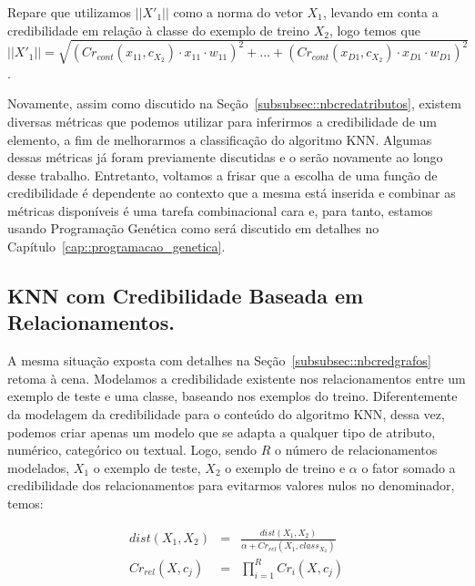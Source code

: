 Repare que utilizamos $||X'_1||$ como a norma do vetor $X_1$, levando em conta a credibilidade em relação à classe do exemplo de treino $X_2$, logo temos que $||X'_1|| = \sqrt{ ( Cr_{cont}(x_{11}, c_{X_2}) \cdot x_{11} \cdot w_{11} )^2 + ... +  ( Cr_{cont}(x_{D1}, c_{X_2}) \cdot x_{D1} \cdot w_{D1} )^2}$.

Novamente, assim como discutido na Seção~\ref{subsubsec::nbcredatributos}, existem diversas métricas que podemos utilizar para inferirmos a credibilidade de um elemento, a fim de melhorarmos a classificação do algoritmo \textsc{KNN}. Algumas dessas métricas já foram previamente discutidas e o serão novamente ao longo desse trabalho. Entretanto, voltamos a frisar que a escolha de uma função de credibilidade é dependente ao contexto que a mesma está inserida e combinar as métricas disponíveis é uma tarefa combinacional cara e, para tanto, estamos usando Programação Genética como será discutido em detalhes no Capítulo~\ref{cap::programacao_genetica}.

\subsection{\textsc{KNN} com Credibilidade Baseada em Relacionamentos.}
\label{subsubsec::knncredgrafos}

A mesma situação exposta com detalhes na Seção~\ref{subsubsec::nbcredgrafos} retoma à cena. Modelamos a credibilidade existente nos relacionamentos entre um exemplo de teste e uma classe, baseando nos exemplos do treino. 
Diferentemente da modelagem da credibilidade para o conteúdo do algoritmo \textsc{KNN}, dessa vez, podemos criar apenas um modelo que se adapta a qualquer tipo de atributo, numérico, categórico ou textual. Logo, sendo $R$ o número de relacionamentos modelados, $X_1$ o exemplo de teste, $X_2$ o exemplo de treino e $\alpha$ o fator somado a credibilidade dos relacionamentos para evitarmos valores nulos no denominador, temos:

\begin{eqnarray}\label{eqn::distancia_grafos}
    dist(X_1, X_2) & = & \frac{ dist(X_1, X_2) } { \alpha + Cr_{rel}(X_1, class_{X_2}) }\\
    Cr_{rel}(X, c_j) & = & \prod^{R}_{i=1} {Cr_{i}(X,c_j)} 
\end{eqnarray}

